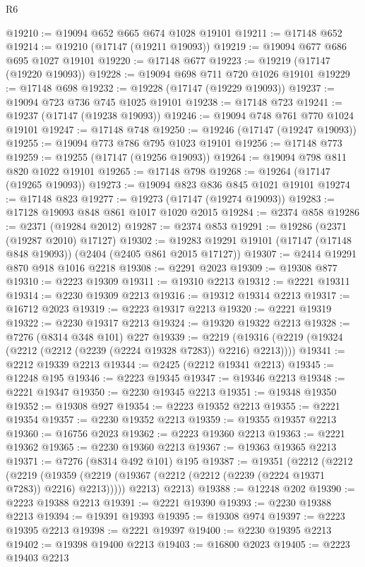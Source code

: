 \begin{lexlean}{R6}
\begin{coremodule}
@19210 := @19094 @652 @665 @674 @1028 @19101
@19211 := @17148 @652
@19214 := @19210 (@17147 (@19211 @19093))
@19219 := @19094 @677 @686 @695 @1027 @19101
@19220 := @17148 @677
@19223 := @19219 (@17147 (@19220 @19093))
@19228 := @19094 @698 @711 @720 @1026 @19101
@19229 := @17148 @698
@19232 := @19228 (@17147 (@19229 @19093))
@19237 := @19094 @723 @736 @745 @1025 @19101
@19238 := @17148 @723
@19241 := @19237 (@17147 (@19238 @19093))
@19246 := @19094 @748 @761 @770 @1024 @19101
@19247 := @17148 @748
@19250 := @19246 (@17147 (@19247 @19093))
@19255 := @19094 @773 @786 @795 @1023 @19101
@19256 := @17148 @773
@19259 := @19255 (@17147 (@19256 @19093))
@19264 := @19094 @798 @811 @820 @1022 @19101
@19265 := @17148 @798
@19268 := @19264 (@17147 (@19265 @19093))
@19273 := @19094 @823 @836 @845 @1021 @19101
@19274 := @17148 @823
@19277 := @19273 (@17147 (@19274 @19093))
@19283 := @17128 @19093 @848 @861 @1017 @1020 @2015
@19284 := @2374 @858
@19286 := @2371 (@19284 @2012)
@19287 := @2374 @853
@19291 := @19286 (@2371 (@19287 @2010) @17127)
@19302 := @19283 @19291 @19101 (@17147 (@17148 @848 @19093)) (@2404 (@2405 @861 @2015 @17127))
@19307 := @2414 @19291 @870 @918 @1016 @2218
@19308 := @2291 @2023
@19309 := @19308 @877
@19310 := @2223 @19309
@19311 := @19310 @2213
@19312 := @2221 @19311
@19314 := @2230 @19309 @2213
@19316 := @19312 @19314 @2213
@19317 := @16712 @2023
@19319 := @2223 @19317 @2213
@19320 := @2221 @19319
@19322 := @2230 @19317 @2213
@19324 := @19320 @19322 @2213
@19328 := @7276 (@8314 @348 @101) @227
@19339 := @2219 (@19316 (@2219 (@19324 (@2212 (@2212 (@2239 (@2224 @19328 @7283)) @2216) @2213))))
@19341 := @2212 @19339 @2213
@19344 := @2425 (@2212 @19341 @2213)
@19345 := @12248 @195
@19346 := @2223 @19345
@19347 := @19346 @2213
@19348 := @2221 @19347
@19350 := @2230 @19345 @2213
@19351 := @19348 @19350
@19352 := @19308 @927
@19354 := @2223 @19352 @2213
@19355 := @2221 @19354
@19357 := @2230 @19352 @2213
@19359 := @19355 @19357 @2213
@19360 := @16756 @2023
@19362 := @2223 @19360 @2213
@19363 := @2221 @19362
@19365 := @2230 @19360 @2213
@19367 := @19363 @19365 @2213
@19371 := @7276 (@8314 @492 @101) @195
@19387 := @19351
    (@2212
      (@2212
        (@2219 (@19359 (@2219 (@19367 (@2212 (@2212 (@2239 (@2224 @19371 @7283)) @2216) @2213)))))
        @2213)
      @2213)
@19388 := @12248 @202
@19390 := @2223 @19388 @2213
@19391 := @2221 @19390
@19393 := @2230 @19388 @2213
@19394 := @19391 @19393
@19395 := @19308 @974
@19397 := @2223 @19395 @2213
@19398 := @2221 @19397
@19400 := @2230 @19395 @2213
@19402 := @19398 @19400 @2213
@19403 := @16800 @2023
@19405 := @2223 @19403 @2213

\end{coremodule}
\end{lexlean}
